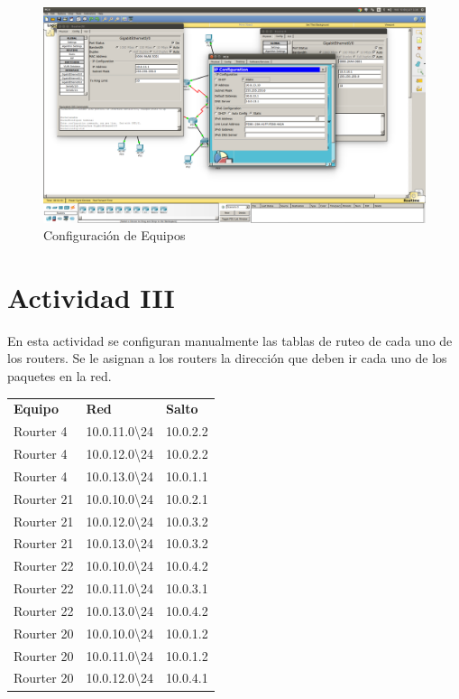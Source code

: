 \documentclass[spanish]{udpreport}
\begin{document}
\begin{figure}[H]
	\centering
	\includegraphics[scale=.25]{imagenes/ips.png}
	\caption{Configuración de Equipos}
	\label{fig:Figura 3.1}
\end{figure}


\section{Actividad III}

En esta actividad se configuran manualmente las tablas de ruteo de cada uno de los routers. Se le asignan a los routers la dirección que deben ir cada uno de los paquetes en la red.

\begin{table}[H]
\centering
\begin{tabular}{p{3cm}|p{4cm}|p{4cm}}
\textbf{Equipo} & \textbf{Red} & \textbf{Salto} \\
       Rourter 4 & 10.0.11.0\textbackslash 24& 10.0.2.2 \\
       Rourter 4 & 10.0.12.0\textbackslash 24& 10.0.2.2 \\
       Rourter 4 & 10.0.13.0\textbackslash 24& 10.0.1.1 \\
       Rourter 21 & 10.0.10.0\textbackslash 24& 10.0.2.1 \\
       Rourter 21 & 10.0.12.0\textbackslash 24& 10.0.3.2 \\
       Rourter 21 & 10.0.13.0\textbackslash 24& 10.0.3.2 \\
       Rourter 22 & 10.0.10.0\textbackslash 24& 10.0.4.2 \\
       Rourter 22 & 10.0.11.0\textbackslash 24& 10.0.3.1 \\
       Rourter 22 & 10.0.13.0\textbackslash 24& 10.0.4.2 \\
       Rourter 20 & 10.0.10.0\textbackslash 24& 10.0.1.2 \\
       Rourter 20 & 10.0.11.0\textbackslash 24& 10.0.1.2 \\
       Rourter 20 & 10.0.12.0\textbackslash 24& 10.0.4.1 \\
\end{tabular}
\end{table}
\end{document}
